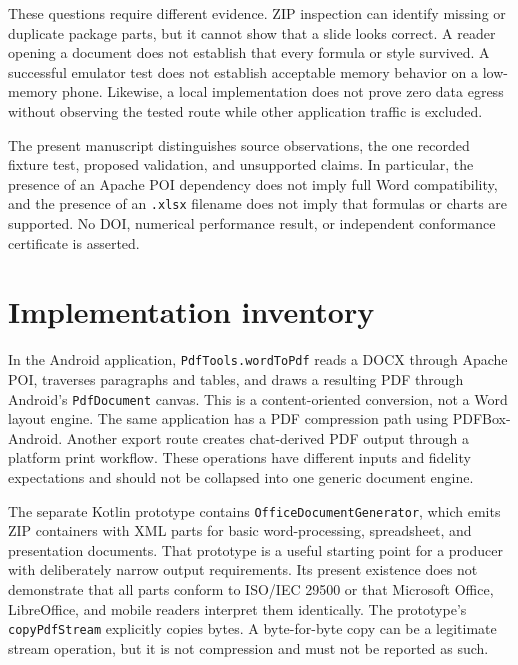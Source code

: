 \documentclass[10pt,letterpaper]{article}
\begin{document}
These questions require different evidence. ZIP inspection can identify missing or duplicate package parts, but it cannot show that a slide looks correct. A reader opening a document does not establish that every formula or style survived. A successful emulator test does not establish acceptable memory behavior on a low-memory phone. Likewise, a local implementation does not prove zero data egress without observing the tested route while other application traffic is excluded.

The present manuscript distinguishes source observations, the one recorded fixture test, proposed validation, and unsupported claims. In particular, the presence of an Apache POI dependency does not imply full Word compatibility, and the presence of an \texttt{.xlsx} filename does not imply that formulas or charts are supported. No DOI, numerical performance result, or independent conformance certificate is asserted.

\section{Implementation inventory}

In the Android application, \texttt{PdfTools.wordToPdf} reads a DOCX through Apache POI, traverses paragraphs and tables, and draws a resulting PDF through Android's \texttt{PdfDocument} canvas. This is a content-oriented conversion, not a Word layout engine. The same application has a PDF compression path using PDFBox-Android. Another export route creates chat-derived PDF output through a platform print workflow. These operations have different inputs and fidelity expectations and should not be collapsed into one generic document engine.

The separate Kotlin prototype contains \texttt{OfficeDocumentGenerator}, which emits ZIP containers with XML parts for basic word-processing, spreadsheet, and presentation documents. That prototype is a useful starting point for a producer with deliberately narrow output requirements. Its present existence does not demonstrate that all parts conform to ISO/IEC 29500 or that Microsoft Office, LibreOffice, and mobile readers interpret them identically. The prototype's \texttt{copyPdfStream} explicitly copies bytes. A byte-for-byte copy can be a legitimate stream operation, but it is not compression and must not be reported as such.
\end{document}
